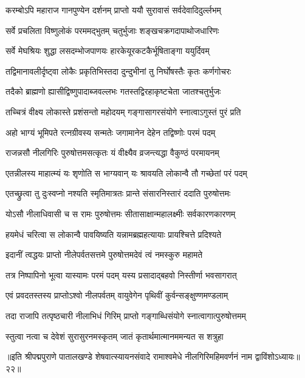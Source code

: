\twolineshloka
{करम्बोऽपि महाराज गानपुण्येन दर्शनम्}
{प्राप्तो ययौ सुरावासं सर्वदेवादिदुर्ल्लभम्}%

\twolineshloka
{सर्वे प्रचलिता विष्णुलोकं परममद्भुतम्}
{चतुर्भुजाः शङ्खचक्रगदापाथोजधारिणः}%

\twolineshloka
{सर्वे मेघश्रियः शुद्धा लसदम्भोजपाणयः}
{हारकेयूरकटकैर्भूषिताङ्गा ययुर्दिवम्}%

\twolineshloka
{तद्विमानावलीर्दृष्ट्वा लोकैः प्रकृतिभिस्तदा}
{दुन्दुभीनां तु निर्घोषस्तैः कृतः कर्णगोचरः}%

\twolineshloka
{तदैको ब्राह्मणो ह्यासीद्विष्णुपादाब्जवल्लभः}
{गतस्तद्विरहाकृष्टचेता जातश्चतुर्भुजः}%

\twolineshloka
{तच्चित्रं वीक्ष्य लोकास्ते प्रशंसन्तो महोदयम्}
{गङ्गासागरसंयोगे स्नात्वाऽगुस्तं पुरं प्रति}%

\twolineshloka
{अहो भाग्यं भूमिपते रत्नग्रीवस्य सन्मतेः}
{जगामानेन देहेन तद्विष्णोः परमं पदम्}%

\twolineshloka
{राजन्नसौ नीलगिरिः पुरुषोत्तमसत्कृतः}
{यं वीक्ष्यैव व्रजन्त्यद्धा वैकुण्ठं परमायनम्}%

\twolineshloka
{एतन्नीलस्य माहात्म्यं यः शृणोति स भाग्यवान्}
{यः श्रावयति लोकान्वै तौ गच्छेतां परं पदम्}%

\twolineshloka
{एतच्छ्रुत्वा तु दुःस्वप्नो नश्यति स्मृतिमात्रतः}
{प्रान्ते संसारनिस्तारं ददाति पुरुषोत्तमः}%

\twolineshloka
{योऽसौ नीलाधिवासी च स रामः पुरुषोत्तमः}
{सीतासाक्षान्महालक्ष्मीः सर्वकारणकारणम्}%

\twolineshloka
{हयमेधं चरित्वा स लोकान्वै पावयिष्यति}
{यन्नामब्रह्महत्यायाः प्रायश्चित्ते प्रदिश्यते}%

\twolineshloka
{इदानीं त्वद्धयः प्राप्तो नीलेपर्वतसत्तमे}
{पुरुषोत्तमदेवं त्वं नमस्कुरु महामते}%

\twolineshloka
{तत्र निष्पापिनो भूत्वा यास्यामः परमं पदम्}
{यस्य प्रसादाद्बहवो निस्तीर्णा भवसागरात्}%

\twolineshloka
{एवं प्रवदतस्तस्य प्राप्तोऽश्वो नीलपर्वतम्}
{वायुवेगेन पृथिवीं कुर्वन्सङ्क्षुण्णमण्डलाम्}%

\twolineshloka
{तदा राजापि तत्पृष्ठचारी नीलाभिधं गिरिम्}
{प्राप्तो गङ्गाब्धिसंयोगे स्नात्वागात्पुरुषोत्तमम्}%

\twolineshloka
{स्तुत्वा नत्वा च देवेशं सुरासुरनमस्कृतम्}
{जातं कृतार्थमात्मानममन्यत स शत्रुहा}%

{॥इति श्रीपद्मपुराणे पातालखण्डे शेषवात्स्यायनसंवादे रामाश्वमेधे नीलगिरिमहिमवर्णनं नाम द्वाविंशोऽध्यायः॥२२॥}

